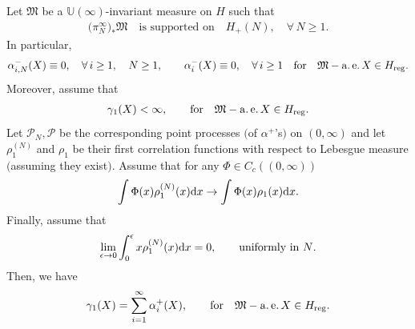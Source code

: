 \begin{Proposition}\label{AbstractGamma1}
Let $\mathfrak{M}$ be a $\mathbb{U}(\infty)$-invariant measure on $H$ such that
\begin{gather*}
\big(\pi_N^{\infty}\big)_*\mathfrak{M} \quad \text{is supported on} \quad H_+(N),\quad \forall\, N \ge 1.
\end{gather*}
In particular,
\begin{gather*}
\alpha_{i,N}^-(X)\equiv 0, \quad \forall\, i\ge 1, \quad N\ge 1, \qquad \alpha_i^-(X)\equiv 0, \quad \forall\, i \ge 1 \quad \text{for} \quad \mathfrak{M}-\operatorname{a.e.} X \in H_{{\rm reg}}.
\end{gather*}
Moreover, assume that
\begin{gather*}
\gamma_1(X)<\infty, \qquad \text{for} \quad \mathfrak{M}-\operatorname{a.e.} X \in H_{{\rm reg}}.
\end{gather*}
Let $\mathcal{P}_N, \mathcal{P}$ be the corresponding point processes $($of $\alpha^+$'s$)$ on $(0,\infty)$ and let $\rho_1^{(N)}$ and $\rho_1$ be their first correlation functions with respect to Lebesgue measure $($assuming they exist$)$. Assume that for any $\Phi \in C_c ((0,\infty) )$
\begin{gather*}
\int \Phi(x)\rho_1^{(N)}(x){\rm d}x\to \int \Phi(x)\rho_1(x){\rm d}x.
\end{gather*}
Finally, assume that
\begin{gather*}
\lim_{\epsilon \to 0} \int_{0}^{\epsilon}x \rho_1^{(N)}(x){\rm d}x=0, \qquad \text{uniformly in $N$}.
\end{gather*}
Then, we have
\begin{gather*}
\gamma_1(X)=\sum_{i=1}^{\infty}\alpha_i^+(X), \qquad \text{for} \quad \mathfrak{M}-\operatorname{a.e.} X \in H_{{\rm reg}}.
\end{gather*}
\end{Proposition}

